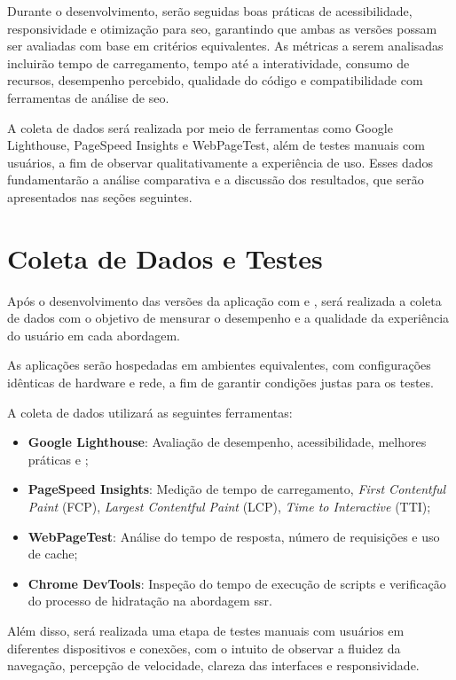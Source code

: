 Durante o desenvolvimento, serão seguidas boas práticas de acessibilidade, responsividade e otimização para \acrshort{seo}, garantindo que ambas as versões possam ser avaliadas com base em critérios equivalentes. As métricas a serem analisadas incluirão tempo de carregamento, tempo até a interatividade, consumo de recursos, desempenho percebido, qualidade do código e compatibilidade com ferramentas de análise de \acrshort{seo}.

A coleta de dados será realizada por meio de ferramentas como Google Lighthouse, PageSpeed Insights e WebPageTest, além de testes manuais com usuários, a fim de observar qualitativamente a experiência de uso. Esses dados fundamentarão a análise comparativa e a discussão dos resultados, que serão apresentados nas seções seguintes.


\section{Coleta de Dados e Testes}
\label{sec:coleta-de-dados-e-testes}

Após o desenvolvimento das versões da aplicação com  e , será realizada a coleta de dados com o objetivo de mensurar o desempenho e a qualidade da experiência do usuário em cada abordagem.

As aplicações serão hospedadas em ambientes equivalentes, com configurações idênticas de hardware e rede, a fim de garantir condições justas para os testes.

A coleta de dados utilizará as seguintes ferramentas:

\begin{itemize}
\item \textbf{Google Lighthouse}: Avaliação de desempenho, acessibilidade, melhores práticas e ;
\item \textbf{PageSpeed Insights}: Medição de tempo de carregamento, \textit{First Contentful Paint} (FCP), \textit{Largest Contentful Paint} (LCP), \textit{Time to Interactive} (TTI);
\item \textbf{WebPageTest}: Análise do tempo de resposta, número de requisições e uso de cache;
\item \textbf{Chrome DevTools}: Inspeção do tempo de execução de scripts e verificação do processo de hidratação na abordagem \acrshort{ssr}.
\end{itemize}

Além disso, será realizada uma etapa de testes manuais com usuários em diferentes dispositivos e conexões, com o intuito de observar a fluidez da navegação, percepção de velocidade, clareza das interfaces e responsividade.

